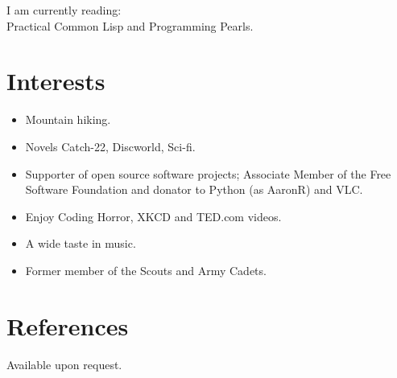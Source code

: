 \documentclass[line,margin]{res}
\begin{document}
\begin{resume}
I am currently reading: \\
Practical Common Lisp and
Programming Pearls.

\section{Interests}
\begin{itemize} \itemsep -2pt %
	\item Mountain hiking. %
	\item Novels Catch-22, Discworld, Sci-fi.
	\item Supporter of open source software projects; Associate Member of the Free Software Foundation and donator to Python (as AaronR) and VLC.
	\item Enjoy Coding Horror, XKCD and TED.com videos.
	\item A wide taste in music.
	\item Former member of the Scouts and Army Cadets.
\end{itemize}


\section{References}
Available upon request.

\end{resume}
\end{document}
